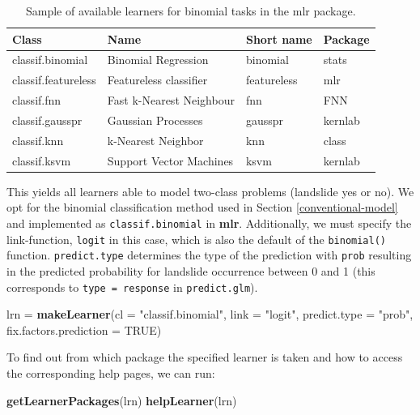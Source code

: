 \documentclass[]{krantz}
\newenvironment{Shaded}{\begin{snugshade}}{\end{snugshade}}
\newcommand{\DataTypeTok}[1]{\textcolor[rgb]{0.27,0.27,0.27}{#1}}
\newcommand{\KeywordTok}[1]{\textcolor[rgb]{0.27,0.27,0.27}{\textbf{#1}}}
\newcommand{\NormalTok}[1]{#1}
\newcommand{\OtherTok}[1]{\textcolor[rgb]{0.37,0.37,0.37}{#1}}
\newcommand{\StringTok}[1]{\textcolor[rgb]{0.5,0.5,0.5}{#1}}
\begin{document}
\begin{table}[t]

\caption[Sample of available learners.]{\label{tab:lrns}Sample of available learners for binomial tasks in the mlr package.}
\centering
\begin{tabular}{llll}
\toprule
Class & Name & Short name & Package\\
\midrule
classif.binomial & Binomial Regression & binomial & stats\\
classif.featureless & Featureless classifier & featureless & mlr\\
classif.fnn & Fast k-Nearest Neighbour & fnn & FNN\\
classif.gausspr & Gaussian Processes & gausspr & kernlab\\
classif.knn & k-Nearest Neighbor & knn & class\\
\addlinespace
classif.ksvm & Support Vector Machines & ksvm & kernlab\\
\bottomrule
\end{tabular}
\end{table}

This yields all learners able to model two-class problems (landslide yes or no).
We opt for the binomial classification method used in Section \ref{conventional-model} and implemented as \texttt{classif.binomial} in \textbf{mlr}.
Additionally, we must specify the link-function, \texttt{logit} in this case, which is also the default of the \texttt{binomial()} function.
\texttt{predict.type} determines the type of the prediction with \texttt{prob} resulting in the predicted probability for landslide occurrence between 0 and 1 (this corresponds to \texttt{type\ =\ response} in \texttt{predict.glm}).

\begin{Shaded}
\begin{Highlighting}[]
\NormalTok{lrn =}\StringTok{ }\KeywordTok{makeLearner}\NormalTok{(}\DataTypeTok{cl =} \StringTok{"classif.binomial"}\NormalTok{,}
                  \DataTypeTok{link =} \StringTok{"logit"}\NormalTok{,}
                  \DataTypeTok{predict.type =} \StringTok{"prob"}\NormalTok{,}
                  \DataTypeTok{fix.factors.prediction =} \OtherTok{TRUE}\NormalTok{)}
\end{Highlighting}
\end{Shaded}

To find out from which package the specified learner is taken and how to access the corresponding help pages, we can run:

\begin{Shaded}
\begin{Highlighting}[]
\KeywordTok{getLearnerPackages}\NormalTok{(lrn)}
\KeywordTok{helpLearner}\NormalTok{(lrn)}
\end{Highlighting}
\end{Shaded}
\end{document}
